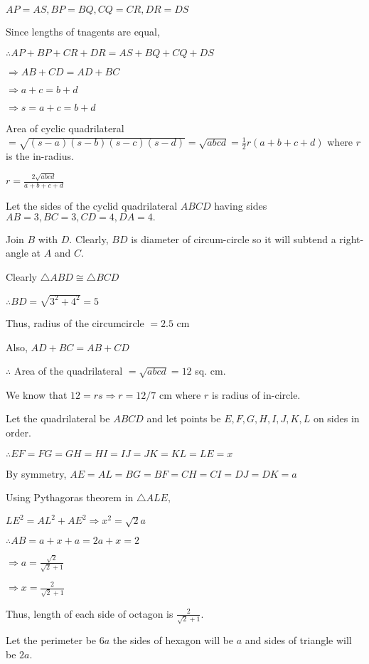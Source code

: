   $AP = AS, BP = BQ, CQ = CR, DR = DS$

  Since lengths of tnagents are equal,

  $\therefore AP + BP + CR + DR = AS + BQ + CQ + DS$

  $\Rightarrow AB + CD = AD + BC$

  $\Rightarrow a + c = b + d$

  $\Rightarrow s = a + c = b + d$

  Area of cyclic quadrilateral $= \sqrt{(s - a)(s - b)(s - c)(s - d)} = \sqrt{abcd} = \frac{1}{2}r(a + b + c + d)$ where
  $r$ is the in-radius.

  $r = \frac{2\sqrt{abcd}}{a + b + c + d}$
\item Let the sides of the cyclid quadrilateral $ABCD$ having sides $AB = 3, BC = 3, CD = 4, DA = 4.$

  Join $B$ with $D.$ Clearly, $BD$ is diameter of circum-circle so it will subtend a right-angle at $A$
  and $C.$

  Clearly $\triangle ABD\cong \triangle BCD$

  $\therefore BD = \sqrt{3^2 + 4^2} = 5$

  Thus, radius of the circumcircle $= 2.5$ cm

  Also, $AD + BC = AB + CD$

  $\therefore$ Area of the quadrilateral $= \sqrt{abcd} = 12$ sq. cm.

  We know that $12 = rs \Rightarrow r = 12/7$ cm where $r$ is radius of in-circle.

\item Let the quadrilateral be $ABCD$ and let points be $E, F, G, H, I, J, K, L$ on sides in order.

  $\therefore EF=FG=GH=HI=IJ=JK=KL=LE=x$

  By symmetry, $AE=AL=BG=BF=CH=CI=DJ=DK=a$

  Using Pythagoras theorem in $\triangle ALE,$

  $LE^2 = AL^2 + AE^2 \Rightarrow x^2 = \sqrt{2}a$

  $\therefore AB = a + x + a = 2a + x = 2$

  $\Rightarrow a = \frac{\sqrt{2}}{\sqrt{2} + 1}$

  $\Rightarrow x = \frac{2}{\sqrt{2} + 1}$

  Thus, length of each side of octagon is $\frac{2}{\sqrt{2} + 1}.$

\item Let the perimeter be $6a$ the sides of hexagon will be $a$ and sides of triangle will be $2a.$

